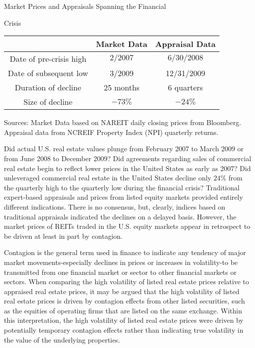 \documentclass[11pt]{article}
\begin{document}
Market Prices and Appraisals Spanning the Financial

Crisis

\begin{center}
\begin{tabular}{|c|c|c|}
\hline
 & Market Data & Appraisal Data \\
\hline
Date of pre-crisis high & $2 / 2007$ & $6 / 30 / 2008$ \\
\hline
Date of subsequent low & 3/2009 & 12/31/2009 \\
\hline
Duration of decline & 25 months & 6 quarters \\
\hline
Size of decline & $-73 \%$ & $-24 \%$ \\
\hline
\end{tabular}
\end{center}

Sources: Market Data based on NAREIT daily closing prices from Bloomberg. Appraisal data from NCREIF Property Index (NPI) quarterly returns.

Did actual U.S. real estate values plunge from February 2007 to March 2009 or from June 2008 to December 2009? Did agreements regarding sales of commercial real estate begin to reflect lower prices in the United States as early as 2007? Did unleveraged commercial real estate in the United States decline only $24 \%$ from the quarterly high to the quarterly low during the financial crisis? Traditional expert-based appraisals and prices from listed equity markets provided entirely different indications. There is no consensus, but, clearly, indices based on traditional appraisals indicated the declines on a delayed basis. However, the market prices of REITs traded in the U.S. equity markets appear in retrospect to be driven at least in part by contagion.

Contagion is the general term used in finance to indicate any tendency of major market movements-especially declines in prices or increases in volatility-to be transmitted from one financial market or sector to other financial markets or sectors. When comparing the high volatility of listed real estate prices relative to appraised real estate prices, it may be argued that the high volatility of listed real estate prices is driven by contagion effects from other listed securities, such as the equities of operating firms that are listed on the same exchange. Within this interpretation, the high volatility of listed real estate prices were driven by potentially temporary contagion effects rather than indicating true volatility in the value of the underlying properties.
\end{document}
